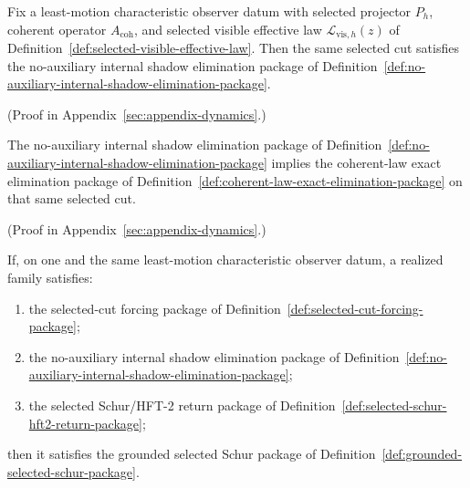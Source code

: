 \begin{theorem}
\label{thm:selected-visible-effective-law-forces-no-auxiliary-shadow-elimination}
Fix a least-motion characteristic observer datum with selected projector
\(P_h\), coherent operator \(A_{\mathrm{coh}}\), and selected visible
effective law \(\mathcal L_{\mathrm{vis},h}(z)\) of
Definition~\ref{def:selected-visible-effective-law}. Then the same selected
cut satisfies the no-auxiliary internal shadow elimination package of
Definition~\ref{def:no-auxiliary-internal-shadow-elimination-package}.
\end{theorem}

(Proof in Appendix~\ref{sec:appendix-dynamics}.)

\begin{theorem}
\label{thm:no-auxiliary-internal-shadow-elimination-forces-coherent-law-exact-elimination}
The no-auxiliary internal shadow elimination package of
Definition~\ref{def:no-auxiliary-internal-shadow-elimination-package} implies
the coherent-law exact elimination package of
Definition~\ref{def:coherent-law-exact-elimination-package} on that same
selected cut.
\end{theorem}

(Proof in Appendix~\ref{sec:appendix-dynamics}.)

\begin{corollary}
\label{cor:selected-cut-plus-no-auxiliary-shadow-plus-schur-return-forces-grounded-package}
If, on one and the same least-motion characteristic observer datum, a realized
family satisfies:
\begin{enumerate}[label=(\alph*), leftmargin=2em, itemsep=0.2em]
\item the selected-cut forcing package of
      Definition~\ref{def:selected-cut-forcing-package};
\item the no-auxiliary internal shadow elimination package of
      Definition~\ref{def:no-auxiliary-internal-shadow-elimination-package};
\item the selected Schur/HFT-2 return package of
      Definition~\ref{def:selected-schur-hft2-return-package};
\end{enumerate}
then it satisfies the grounded selected Schur package of
Definition~\ref{def:grounded-selected-schur-package}.
\end{corollary}

